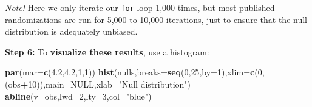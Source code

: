\documentclass[
]{book}
\newenvironment{Shaded}{\begin{snugshade}}{\end{snugshade}}
\newcommand{\CommentTok}[1]{\textcolor[rgb]{0.56,0.35,0.01}{\textit{#1}}}
\newcommand{\ControlFlowTok}[1]{\textcolor[rgb]{0.13,0.29,0.53}{\textbf{#1}}}
\newcommand{\DataTypeTok}[1]{\textcolor[rgb]{0.13,0.29,0.53}{#1}}
\newcommand{\DecValTok}[1]{\textcolor[rgb]{0.00,0.00,0.81}{#1}}
\newcommand{\FloatTok}[1]{\textcolor[rgb]{0.00,0.00,0.81}{#1}}
\newcommand{\KeywordTok}[1]{\textcolor[rgb]{0.13,0.29,0.53}{\textbf{#1}}}
\newcommand{\NormalTok}[1]{#1}
\newcommand{\OperatorTok}[1]{\textcolor[rgb]{0.81,0.36,0.00}{\textbf{#1}}}
\newcommand{\OtherTok}[1]{\textcolor[rgb]{0.56,0.35,0.01}{#1}}
\newcommand{\StringTok}[1]{\textcolor[rgb]{0.31,0.60,0.02}{#1}}
\begin{document}
\begin{Shaded}
\end{Shaded}

\emph{Note!} Here we only iterate our \texttt{for} loop 1,000 times, but most published randomizations are run for 5,000 to 10,000 iterations, just to ensure that the null distribution is adequately unbiased.

\textbf{Step 6:} To \textbf{visualize these results}, use a histogram:

\begin{Shaded}
\begin{Highlighting}[]
\KeywordTok{par}\NormalTok{(}\DataTypeTok{mar=}\KeywordTok{c}\NormalTok{(}\FloatTok{4.2}\NormalTok{,}\FloatTok{4.2}\NormalTok{,}\DecValTok{1}\NormalTok{,}\DecValTok{1}\NormalTok{))}
\KeywordTok{hist}\NormalTok{(nulls,}\DataTypeTok{breaks=}\KeywordTok{seq}\NormalTok{(}\DecValTok{0}\NormalTok{,}\DecValTok{25}\NormalTok{,}\DataTypeTok{by=}\DecValTok{1}\NormalTok{),}\DataTypeTok{xlim=}\KeywordTok{c}\NormalTok{(}\DecValTok{0}\NormalTok{,(obs}\OperatorTok{+}\DecValTok{10}\NormalTok{)),}\DataTypeTok{main=}\OtherTok{NULL}\NormalTok{,}\DataTypeTok{xlab=}\StringTok{"Null distribution"}\NormalTok{)}
\KeywordTok{abline}\NormalTok{(}\DataTypeTok{v=}\NormalTok{obs,}\DataTypeTok{lwd=}\DecValTok{2}\NormalTok{,}\DataTypeTok{lty=}\DecValTok{3}\NormalTok{,}\DataTypeTok{col=}\StringTok{"blue"}\NormalTok{)}
\end{Highlighting}
\end{Shaded}
\end{document}
